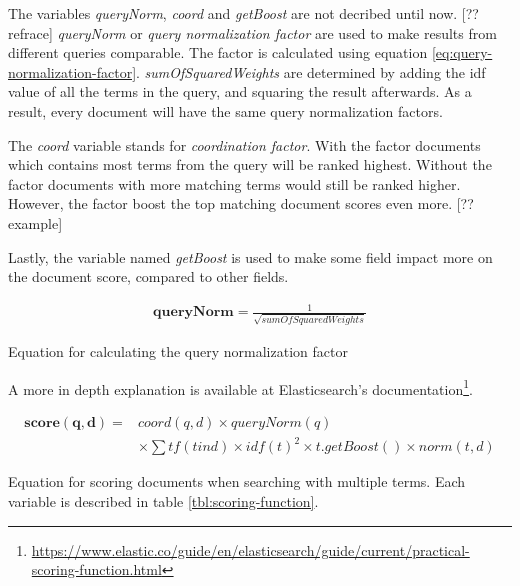 The variables \textit{queryNorm}, \textit{coord} and \textit{getBoost} are not decribed until now. [?? refrace]
\textit{queryNorm} or \textit{query normalization factor} are used to make results from different queries comparable.
The factor is calculated using equation \ref{eq:query-normalization-factor}.
\textit{sumOfSquaredWeights} are determined by adding the idf value of all the terms in the query,
and squaring the result afterwards.
As a result, every document will have the same query normalization factors.

The \textit{coord} variable stands for \textit{coordination factor}.
With the factor documents which contains most terms from the query will be ranked highest.
Without the factor documents with more matching terms would still be ranked higher.
However, the factor boost the top matching document scores even more.
[?? example]

Lastly, the variable named \textit{getBoost} is used to make some field impact more on the document score,
compared to other fields.

\begin{cequation}
	\begin{equation}
		\begin{aligned}
			\mathbf{queryNorm} = \frac{1}{\sqrt{sumOfSquaredWeights}}
		\end{aligned}
	\end{equation}
	\caption{Equation for calculating the query normalization factor}
  \label{eq:query-normalization-factor}
\end{cequation}

A more in depth explanation is available at Elasticsearch's documentation\footnote{\url{https://www.elastic.co/guide/en/elasticsearch/guide/current/practical-scoring-function.html}}.

\begin{cequation}
	\begin{equation}
		\begin{aligned}
			\mathbf{score(q,d)} = & coord(q,d) \times queryNorm(q) \\
														& \times \sum tf(t in d) \times idf(t)^2 \times t.getBoost() \times norm(t,d)
		\end{aligned}
	\end{equation}
	\caption{Equation for scoring documents when searching with multiple terms. Each variable is described in table \ref{tbl:scoring-function}.}
  \label{eq:scoring-function}
\end{cequation}

